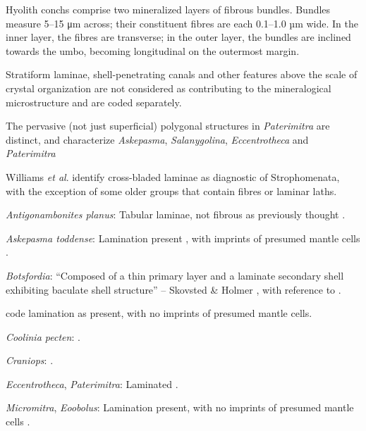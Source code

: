 \documentclass[openany]{book}
\theoremstyle{definition}
\theoremstyle{definition}
\theoremstyle{definition}
\theoremstyle{remark}
\begin{document}
Hyolith conchs comprise two mineralized layers of fibrous bundles.
Bundles measure 5--15 μm across; their constituent fibres are each
0.1--1.0 µm wide. In the inner layer, the fibres are transverse; in the
outer layer, the bundles are inclined towards the umbo, becoming
longitudinal on the outermost margin.

Stratiform laminae, shell-penetrating canals and other features above
the scale of crystal organization are not considered as contributing to
the mineralogical microstructure and are coded separately.

The pervasive (not just superficial) polygonal structures in
\emph{Paterimitra} are distinct, and characterize \emph{Askepasma},
\emph{Salanygolina}, \emph{Eccentrotheca} and \emph{Paterimitra}
\citep{Larsson2014iPaterimitra}

Williams \emph{et al}.
\citeyearpar{Williams2000LinguliformeaCraniiformea} identify
cross-bladed laminae as diagnostic of Strophomenata, with the exception
of some older groups that contain fibres or laminar laths.

\hypertarget{Antigonambonites_planus-coding-127}{}
\emph{Antigonambonites planus}: Tabular laminae, not fibrous as
previously thought \citep{Madison2017Laminarshell}.

\hypertarget{Askepasma_toddense-coding-127}{}
\emph{Askepasma toddense}: Lamination present
\citep{Balthasar2009Homologousskeletal}, with imprints of presumed
mantle cells \citep[following][appendix 2]{Williams1998Thediversity}.

\hypertarget{Botsfordia-coding-127}{}
\emph{Botsfordia}: ``Composed of a thin primary layer and a laminate
secondary shell exhibiting baculate shell structure'' -- Skovsted \&
Holmer \citeyearpar{Skovsted2005EarlyCambrian}, with reference to
\citet{Skovsted2003EarlyCambrian}.

\citet[appendix 2]{Williams1998Thediversity} code lamination as present,
with no imprints of presumed mantle cells.

\hypertarget{Coolinia_pecten-coding-127}{}
\emph{Coolinia pecten}: \citet{Dewing2004}.

\hypertarget{Craniops-coding-127}{}
\emph{Craniops}: \citep[fig. 249.1]{Williams1997Introduction}.

\hypertarget{Eccentrotheca-coding-127}{}
\emph{Eccentrotheca}, \emph{Paterimitra}: Laminated
\citep{Balthasar2009Homologousskeletal}.

\hypertarget{Eoobolus-coding-127}{}
\emph{Micromitra}, \emph{Eoobolus}: Lamination present, with no imprints
of presumed mantle cells \citep[following][appendix
2]{Williams1998Thediversity}.
\end{document}

